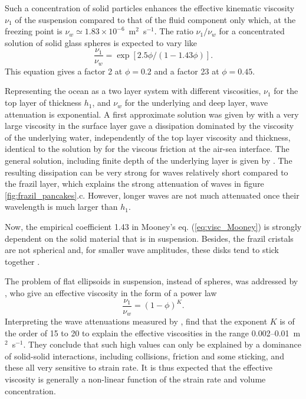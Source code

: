 Such a concentration of solid particles enhances the effective kinematic viscosity $\nu_1$ of the suspension compared to that of the fluid component only which, at the freezing point is $\nu_w \simeq 1.83 \times 10^{-6}$~m$^2$~s$^{-1}$. The ratio $\nu_1/\nu_w$ for a concentrated solution of solid glass spheres 
is expected to vary like \citep{Mooney1951}
\begin{equation}
\frac{\nu_1}{\nu_w} = \exp \left[2.5 \phi /(1-1.43 \phi)\right].\label{eq:visc_Mooney}
\end{equation}
 This equation gives a factor 2 at $\phi=0.2$ and a factor 23 at $\phi=0.45$. 
 
Representing the ocean as a two layer system with different viscosities, $\nu_1$ for the top layer of thickness $h_1$, and $\nu_w$ for the underlying and deep layer, wave attenuation is exponential. A first approximate solution was given by \cite{Weber1987} with a very large viscosity in the surface layer gave a dissipation dominated by the viscosity of the underlying water, independently of the top layer viscosity and thickness, identical to the solution by 
\cite{Dore1978} for the viscous friction at the air-sea interface. The general solution, including finite depth of the underlying layer is given by \cite{Keller1998}. The resulting dissipation can be very strong for waves relatively short compared to the frazil layer, which explains the strong attenuation of waves in figure \ref{fig:frazil_pancakes}.c. However, longer waves are not much attenuated once their wavelength is much larger than $h_1$. 

 
 Now, the empirical coefficient 1.43 in Mooney's eq. (\ref{eq:visc_Mooney}) is strongly dependent on the solid material that is in suspension. 
Besides, the frazil cristals are not spherical and, for smaller wave amplitudes, these disks tend to stick together \citep{Martin&Kauffman1981}. 

The problem of flat ellipsoids in suspension, instead of spheres, was addressed by \cite{deCarolis&al.2005}, who give an effective viscosity in the form of a power law  
\begin{equation}
\frac{\nu_1}{\nu_w} = (1- \phi)^K.
\end{equation}
Interpreting the wave attenuations measured by \cite{Martin&Kauffman1981}, \cite{deCarolis&al.2005} find 
that the exponent $K$ is of the order of 15 to 20 to explain the effective viscosities in the range 0.002--0.01~m$^2$~s$^{-1}$. They conclude that such high values can only be explained by a dominance of solid-solid interactions, including 
collisions, friction and some sticking, and these all very sensitive to strain rate. It is thus expected that the effective viscosity is generally a non-linear function of the strain rate and volume concentration. 

